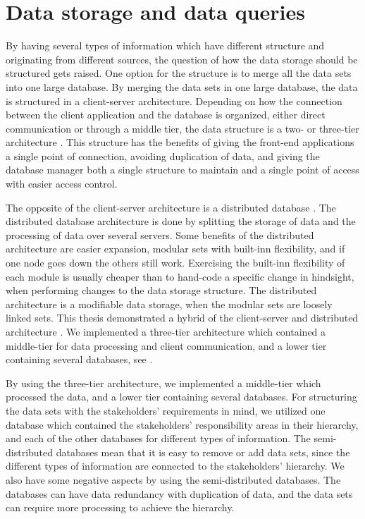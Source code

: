 


\section{Data storage and data queries} %
\label{sec:discussion_data_storage_and_data_queries}
By having several types of information which have different structure and
originating from different sources, the question of how the data storage should
be structured gets raised. One option for the structure is to merge all the
data sets into one large database. By merging the data sets in one large
database, the data is structured in a client-server architecture. Depending on 
how the connection between the client application and the database is
organized, either direct communication or through a middle tier, the data
structure is a two- or three-tier architecture \cite[pp. 294-297]{toftHanseMallaugDatabaser}.
This structure has the benefits of giving the front-end applications a single
point of connection, avoiding duplication of data, and giving the database 
manager both a single structure to maintain and a single point of access with 
easier access control.

The opposite of the client-server architecture is a distributed
database \cite[pp. 301-303]{toftHanseMallaugDatabaser}. The distributed database
architecture is done by splitting the storage of data and the processing of
data over several servers. Some benefits of the distributed architecture are 
easier expansion, modular sets with built-inn flexibility, and if one node 
goes down the others still work. Exercising the built-inn flexibility of each
module is usually cheaper than to hand-code a specific change in hindsight\cite[pp. 117-130]{Bass:2012:SAP:2392670},
when performing changes to the data storage structure. The distributed
architecture is a modifiable data storage, when the modular sets are loosely
linked sets. 
This thesis demonstrated a hybrid of the client-server and distributed
architecture \cite[pp. 297-299]{toftHanseMallaugDatabaser}. We implemented a 
three-tier architecture which contained a middle-tier for data processing and 
client communication, and a lower tier containing several databases, see .

By using the three-tier architecture, we implemented a middle-tier which 
processed the data, and a lower tier containing several databases. For
structuring the data sets with the stakeholders' requirements in mind, we
utilized one database which contained the stakeholders' responsibility areas in
their hierarchy, and each of the other databases for different types of 
information. The semi-distributed databases mean that it is easy to remove or
add data sets, since the different types of information are connected to the
stakeholders' hierarchy. We also have some negative aspects by using
the semi-distributed databases. The databases can have data redundancy with
duplication of data, and the data sets can require more processing to achieve 
the hierarchy. \\

